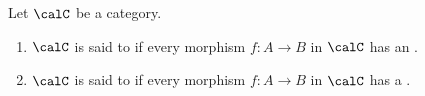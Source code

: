 \begin{definition} \label{definition:category_with_images_coimages}
    Let $\calC$ be a category. 
    \begin{enumerate}
        \item $\calC$ is said to  if every morphism $f: A \to B$ in $\calC$ has an .
        \item $\calC$ is said to  if every morphism $f: A \to B$ in $\calC$ has a .
    \end{enumerate}
\end{definition}